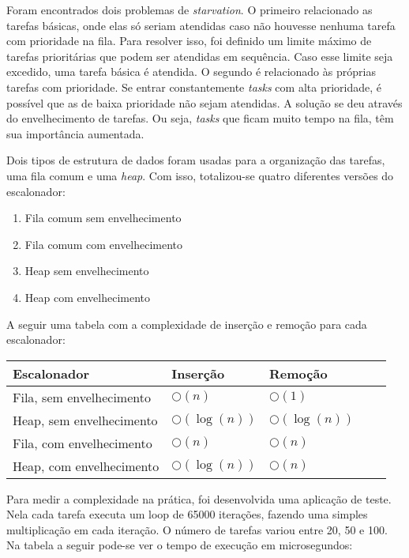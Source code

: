 \documentclass[a4paper,onecolumn, 10pt]{article}
\begin{document}
Foram encontrados dois problemas de \textit{starvation}. O primeiro relacionado as tarefas básicas,
onde elas só seriam atendidas caso não houvesse nenhuma tarefa com prioridade na fila. Para resolver isso, foi definido um
limite máximo de tarefas prioritárias que podem ser atendidas em sequência. Caso esse limite seja excedido, uma tarefa
básica é atendida. O segundo é relacionado às próprias tarefas com prioridade. Se entrar constantemente \textit{tasks} com alta
prioridade, é possível que as de baixa prioridade não sejam atendidas. A solução se deu através do envelhecimento de
tarefas. Ou seja, \textit{tasks} que ficam muito tempo na fila, têm sua importância aumentada.

Dois tipos de estrutura de dados foram usadas para a organização das tarefas, uma fila comum e uma \textit{heap}. Com
isso, totalizou-se quatro diferentes versões do escalonador:
\begin{enumerate}
    \item Fila comum sem envelhecimento
    \item Fila comum com envelhecimento
    \item Heap sem envelhecimento
    \item Heap com envelhecimento
\end{enumerate}
A seguir uma tabela com a complexidade de inserção e remoção para cada escalonador:
\begin{center}
    \begin{tabular}{ | l | l | l | l | p{5cm} |}
    \hline
    Escalonador & Inserção & Remoção \\ \hline
    Fila, sem envelhecimento & $\bigcirc(n)$ & $\bigcirc(1)$ \\ \hline 
    Heap, sem envelhecimento & $\bigcirc(\log(n))$ & $\bigcirc(\log(n))$ \\ \hline
    Fila, com envelhecimento & $\bigcirc(n)$ & $\bigcirc(n)$ \\ \hline
    Heap, com envelhecimento & $\bigcirc(\log(n))$ & $\bigcirc(n)$ \\ \hline
    \end{tabular}
\end{center}
Para medir a complexidade na prática, foi desenvolvida uma aplicação de teste. Nela cada tarefa executa um loop de 65000
iterações, fazendo uma simples multiplicação em cada iteração. O número de tarefas variou entre 20, 50 e 100.
Na tabela a seguir pode-se ver o tempo de execução em microsegundos:
\end{document}

